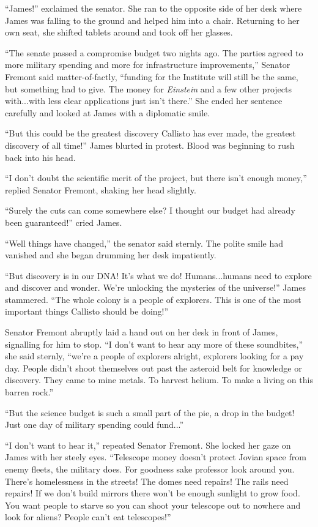\documentclass[12pt]{article} %
\begin{document}
``James!'' exclaimed the senator. She ran to the opposite side of her desk where James was falling to the ground and helped him into a chair. Returning to her own seat, she shifted tablets around and took off her glasses.

``The senate passed a compromise budget two nights ago. The parties agreed to more military spending and more for infrastructure improvements,'' Senator Fremont said matter-of-factly, ``funding for the Institute will still be the same, but something had to give. The money for \textit{Einstein} and a few other projects with...with less clear applications just isn't there.'' She ended her sentence carefully and looked at James with a diplomatic smile.

``But this could be the greatest discovery Callisto has ever made, the greatest discovery of all time!'' James blurted in protest. Blood was beginning to rush back into his head.

``I don't doubt the scientific merit of the project, but there isn't enough money,'' replied Senator Fremont, shaking her head slightly.

``Surely the cuts can come somewhere else? I thought our budget had already been guaranteed!'' cried James.

``Well things have changed,'' the senator said sternly. The polite smile had vanished and she began drumming her desk impatiently.

``But discovery is in our DNA! It's what we do! Humans...humans need to explore and discover and wonder. We're unlocking the mysteries of the universe!'' James stammered. ``The whole colony is a people of explorers. This is one of the most important things Callisto should be doing!''

Senator Fremont abruptly laid a hand out on her desk in front of James, signalling for him to stop. ``I don't want to hear any more of these soundbites,'' she said sternly, ``we're a people of explorers alright, explorers looking for a pay day. People didn't shoot themselves out past the asteroid belt for knowledge or discovery. They came to mine metals. To harvest helium. To make a living on this barren rock.''

``But the science budget is such a small part of the pie, a drop in the budget! Just one day of military spending could fund...''

``I don't want to hear it,'' repeated Senator Fremont. She locked her gaze on James with her steely eyes. ``Telescope money doesn't protect Jovian space from enemy fleets, the military does. For goodness sake professor look around you. There's homelessness in the streets! The domes need repairs! The rails need repairs! If we don't build mirrors there won't be enough sunlight to grow food. You want people to starve so you can shoot your telescope out to nowhere and look for aliens? People can't eat telescopes!''
\end{document}
